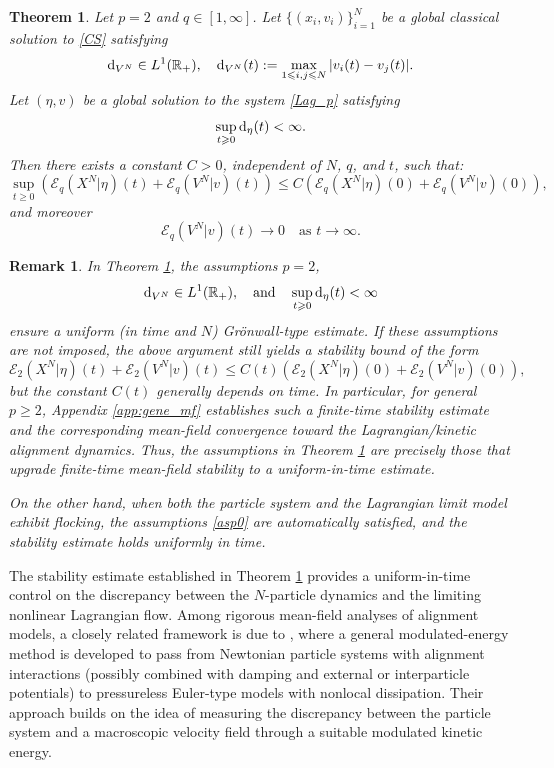 \documentclass[10pt,reqno]{amsart}
\renewcommand{\ge}{\geqslant}
\renewcommand{\leq}{\leqslant}
\renewcommand{\le}{\leqslant}
\numberwithin{equation}{section}
\newtheorem{theorem}{Theorem}[section]
\newtheorem{remark}{Remark}[section]
\newcommand{\R}{\mathbb R}
\newcommand{\bq}{\begin{equation}}
\newcommand{\eq}{\end{equation}}
\newcommand{\lt}{\left}
\newcommand{\rt}{\right}
\newcommand{\rd}{\textnormal{d}}
\begin{document}
\begin{theorem}\label{thm:deri_LA} 
 Let $p=2$ and $q \in [1,\infty]$. Let $\{(x_i,v_i)\}_{i=1}^N$ be a global classical solution to \eqref{CS} satisfying
\[
\rd_{V^N}\in L^1(\R_+), \quad \rd_{V^N}(t):=\max_{1\leq i,j \leq N}|v_i(t)-v_j(t)|.
\]
Let $(\eta, v)$ be a global solution to the system \eqref{Lag_p} satisfying
\[
\sup_{t \ge 0}\rd_\eta(t) <\infty.
\]
Then there exists a constant $C>0$, independent of $N$, $q$, and $t$, such that:
\[
\sup_{t \ge 0}\lt( \mathscr{E}_q(X^N|\eta)(t)+\mathscr{E}_q(V^N|v)(t)\rt) \le C\lt(\mathscr{E}_q(X^N|\eta)(0)+\mathscr{E}_q(V^N|v)(0)\rt),
\]
and moreover
\[
\mathscr{E}_q(V^N|v)(t) \to 0 \quad \text{as } t \to \infty.
\]
\end{theorem}

 
\begin{remark}  
In Theorem \ref{thm:deri_LA}, the assumptions $p=2$,
\bq\label{asp0}
\rd_{V^N} \in L^1(\R_+), \quad\text{and}\quad \sup_{t\ge0} \rd_\eta(t)<\infty
\eq
ensure a uniform (in time and $N$) Gr\"onwall-type estimate. If these assumptions are not imposed, the above argument still yields a stability bound of the form
\[
\mathscr{E}_2(X^N|\eta)(t)+\mathscr{E}_2(V^N|v)(t)  \le C(t)\lt(\mathscr{E}_2(X^N|\eta)(0)+\mathscr{E}_2(V^N|v)(0)\rt),
\]
but the constant $C(t)$ generally depends on time. In particular, for general $p\ge2$, Appendix \ref{app:gene_mf} establishes such a finite-time stability estimate and the corresponding mean-field convergence toward the Lagrangian/kinetic alignment dynamics. Thus, the assumptions in Theorem \ref{thm:deri_LA} are precisely those that upgrade finite-time mean-field stability to a \emph{uniform-in-time} estimate.

On the other hand, when both the particle system and the Lagrangian limit model exhibit flocking, the assumptions \eqref{asp0} are automatically satisfied, and the stability estimate holds uniformly in time.
\end{remark}
 

The stability estimate established in Theorem \ref{thm:deri_LA} provides a uniform-in-time control on the discrepancy between the $N$-particle dynamics and the limiting nonlinear Lagrangian flow. Among rigorous mean-field analyses of alignment models, a closely related framework is due to \cite{CC21}, where a general modulated-energy method is developed to pass from Newtonian particle systems with alignment interactions (possibly combined with damping and external or interparticle potentials) to pressureless Euler-type models with nonlocal dissipation.
Their approach builds on the idea of measuring the discrepancy between the particle system and a macroscopic velocity field through a suitable modulated kinetic energy.
\end{document}
